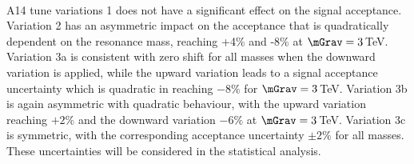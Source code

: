 

\paragraph{}
A14 tune variations 1 does not have a significant effect on the signal acceptance. Variation 2 has an asymmetric impact on the acceptance that is quadratically dependent on the resonance mass, reaching +4\% and -8\% at $\mGrav=3$\,TeV. Variation 3a is consistent with zero shift for all masses when the downward variation is applied, while the upward variation leads to a signal acceptance uncertainty which is quadratic in \mGrav reaching $-8\%$ for $\mGrav=3$\,TeV. Variation 3b is again asymmetric with quadratic behaviour, with the upward variation reaching $+2\%$ and the downward variation $-6\%$ at $\mGrav=3$\,TeV. Variation 3c is symmetric, with the corresponding acceptance uncertainty $\pm 2\%$ for all masses. These uncertainties will be considered in the statistical analysis.

